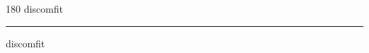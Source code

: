 
\begin{frame}
\begin{center}
\begin{turn}{180}
{\fontsize{2.5cm}{1em}\selectfont discomfit}
\end{turn}
\vspace{1em}\par  
\hrule
\vspace{1em}\par  
{\fontsize{2.5cm}{1em}\selectfont discomfit}
\end{center}
\end{frame}
